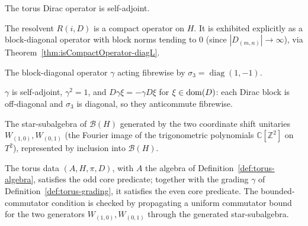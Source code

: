 \begin{theorem}
  \label{thm:torus-diracDirac-isSelfAdjoint}
  \leanok
  The torus Dirac operator is self-adjoint.
\end{theorem}

\begin{theorem}
  \label{thm:torus-isCompactOperator-resolvent-I}
  \leanok
  The resolvent $R(i, D)$ is a compact operator on $H$. It is exhibited explicitly as a
  block-diagonal operator with block norms tending to $0$ (since $|D_{(m,n)}| \to \infty$),
  via Theorem~\ref{thm:isCompactOperator-diagL}.
\end{theorem}

\begin{definition}
  \label{def:torus-grading}
  \leanok
  The block-diagonal operator $\gamma$ acting fibrewise by $\sigma_3 =
  \operatorname{diag}(1,-1)$.
\end{definition}

\begin{lemma}
  \label{lem:torus-grading-properties}
  \leanok
  $\gamma$ is self-adjoint, $\gamma^2 = 1$, and $D\gamma\xi = -\gamma D\xi$ for $\xi \in \operatorname{dom}(D)$: each Dirac block is off-diagonal and $\sigma_3$ is diagonal, so they anticommute
  fibrewise.
\end{lemma}

\begin{definition}
  \label{def:torus-algebra}
  \leanok
  The star-subalgebra of $\mathcal{B}(H)$ generated by the two coordinate shift unitaries
  $W_{(1,0)}, W_{(0,1)}$ (the Fourier image of the trigonometric polynomials
  $\mathbb{C}[\mathbb{Z}^2]$ on $T^2$), represented by inclusion into $\mathcal{B}(H)$.
\end{definition}

\begin{theorem}
  \label{thm:torus-isEvenSpectralTriple}
  \leanok
  The torus data $(A, H, \pi, D)$, with $A$ the algebra of
  Definition~\ref{def:torus-algebra}, satisfies the odd core predicate; together with the
  grading $\gamma$ of Definition~\ref{def:torus-grading}, it satisfies the even core predicate. The
  bounded-commutator condition is checked by propagating a uniform commutator bound for the
  two generators $W_{(1,0)}, W_{(0,1)}$ through the generated star-subalgebra.
\end{theorem}

